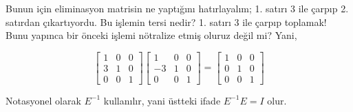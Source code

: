 \documentclass[12pt,fleqn]{article}\usepackage{../../common}
\begin{document}
Bunun için eliminasyon matrisin ne yaptığını hatırlayalım; 1. satırı 3 ile
çarpıp 2. satırdan çıkartıyordu. Bu işlemin tersi nedir? 1. satırı 3 ile
çarpıp toplamak! Bunu yapınca bir önceki işlemi nötralize etmiş oluruz
değil mi? Yani,

$$ 
 \left[\begin{array}{rrr}
1 & 0 & 0 \\
3 & 1 & 0 \\
0 & 0 & 1
\end{array}\right] 
 \left[\begin{array}{rrr}
1 & 0 & 0 \\
-3 & 1 & 0 \\
0 & 0 & 1
\end{array}\right] 
=
 \left[\begin{array}{rrr}
1 & 0 & 0 \\
0 & 1 & 0 \\
0 & 0 & 1
\end{array}\right] 
$$

Notasyonel olarak $E^{-1}$ kullanılır, yani üstteki ifade $E^{-1}E = I$ olur.
\end{document}
